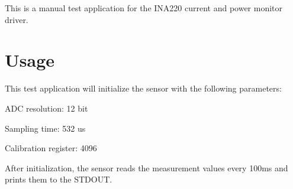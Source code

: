 This is a manual test application for the I\+N\+A220 current and power monitor driver.

\section*{Usage}

This test application will initialize the sensor with the following parameters\+:
\begin{DoxyItemize}
\item A\+DC resolution\+: 12 bit
\item Sampling time\+: 532 us
\item Calibration register\+: 4096
\end{DoxyItemize}

After initialization, the sensor reads the measurement values every 100ms and prints them to the S\+T\+D\+O\+UT. 